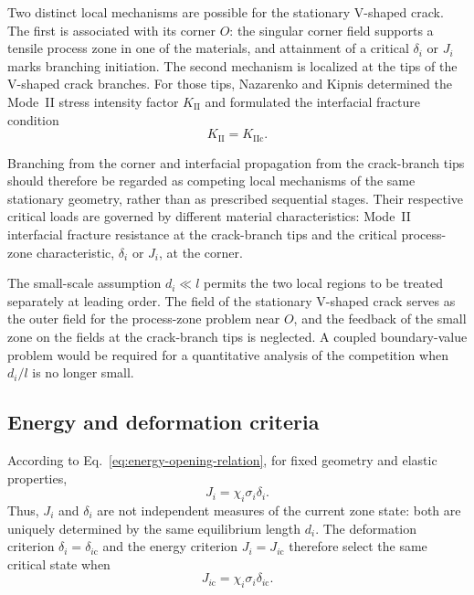 \documentclass[pdflatex,onecolumn,sn-mathphys-ay]{sn-jnl}
\begin{document}
Two distinct local mechanisms are possible for the stationary V-shaped
crack. The first is associated with its corner $O$: the singular corner
field supports a tensile process zone in one of the materials, and
attainment of a critical $\delta_i$ or $J_i$ marks branching initiation.
The second mechanism is localized at the tips of the V-shaped crack branches. For those tips, Nazarenko and Kipnis
\citeyearpar{NazarenkoKipnis2022Equilibrium} determined the Mode~II stress
intensity factor $K_{\mathrm{II}}$ and formulated the interfacial
fracture condition
\begin{equation*}
  K_{\mathrm{II}}=K_{\mathrm{IIc}}.
\end{equation*}

Branching from the corner and interfacial propagation from the crack-branch tips
should therefore be regarded as competing local mechanisms of the same
stationary geometry, rather than as prescribed sequential stages. Their
respective critical loads are governed by different material
characteristics: Mode~II interfacial fracture resistance at the crack-branch tips
and the critical process-zone characteristic, $\delta_i$ or $J_i$, at
the corner.

The small-scale assumption $d_i\ll l$ permits the two local regions to be
treated separately at leading order. The field of the stationary V-shaped
crack serves as the outer field for the process-zone problem near $O$, and
the feedback of the small zone on the fields at the crack-branch tips is
neglected. A coupled boundary-value problem would be required for a
quantitative analysis of the competition when $d_i/l$ is no longer small.

\subsection{Energy and deformation criteria}
\label{subsec:discussion-criteria}

According to Eq.~\eqref{eq:energy-opening-relation}, for fixed geometry
and elastic properties,
\begin{equation*}
  J_i=\chi_i\sigma_i\delta_i.
\end{equation*}
Thus, $J_i$ and $\delta_i$ are not independent measures of the current
zone state: both are uniquely determined by the same equilibrium length
$d_i$. The deformation criterion
$\delta_i=\delta_{i\mathrm{c}}$ and the energy criterion
$J_i=J_{i\mathrm{c}}$ therefore select the same critical state when
\begin{equation*}
  J_{i\mathrm{c}}
  =\chi_i\sigma_i\delta_{i\mathrm{c}}.
\end{equation*}
\end{document}

